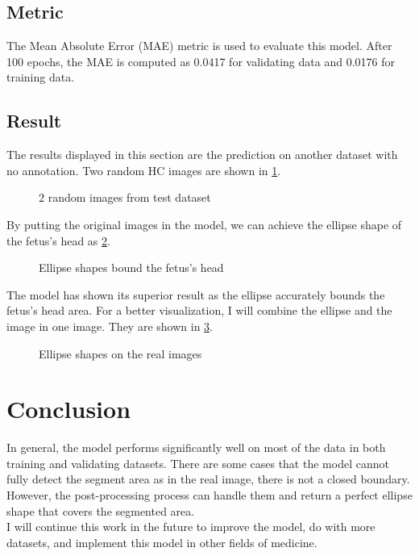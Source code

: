 \documentclass[conference]{article}
\begin{document}
\subsection{Metric}
The Mean Absolute Error (MAE) metric is used to evaluate this model. After 100 epochs, the MAE is computed as 0.0417 for validating data and 0.0176 for training data.\\

\subsection{Result}
The results displayed in this section are the prediction on another dataset with no annotation. Two random HC images are shown in \ref{fig:original}.
\begin{figure}[hbt!]%
    \centering
    \qquad
    \caption{2 random images from test dataset}%
    \label{fig:original}%
\end{figure}

By putting the original images in the model, we can achieve the ellipse shape of the fetus's head as \ref{fig:segmented}.
\begin{figure}[hbt!]%
    \centering
    \qquad
    \caption{Ellipse shapes bound the fetus's head}%
    \label{fig:segmented}%
\end{figure}

The model has shown its superior result as the ellipse accurately bounds the fetus's head area. For a better visualization, I will combine the ellipse and the image in one image. They are shown in \ref{fig:merge}.
\begin{figure}[hbt!]%
    \centering
    \qquad
    \caption{Ellipse shapes on the real images}%
    \label{fig:merge}%
\end{figure}

\section{Conclusion}
In general, the model performs significantly well on most of the data in both training and validating datasets. There are some cases that the model cannot fully detect the segment area as in the real image, there is not a closed boundary. However, the post-processing process can handle them and return a perfect ellipse shape that covers the segmented area.\\
I will continue this work in the future to improve the model, do with more datasets, and implement this model in other fields of medicine.
\end{document}
